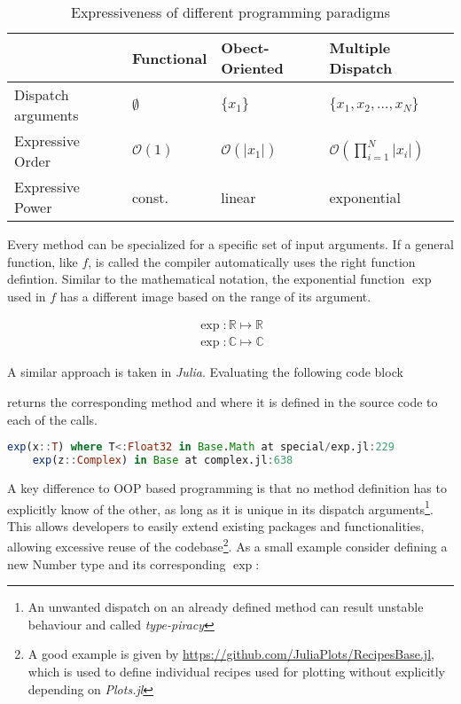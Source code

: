 \begin{table}
    \begin{tabular}{|l|l|l|l|} \hline
        & Functional & Obect-Oriented & Multiple Dispatch \\ \hline
        Dispatch arguments & $\emptyset$ & $\lbrace x_1 \rbrace$ & $\lbrace x_1 , x_2, \dots, x_N \rbrace$ \\
        Expressive Order &  $\mathcal{O}\left(1\right)$ & $\mathcal{O}\left(\left|x_1\right|\right)$ &  $\mathcal{O}\left(\prod_{i=1}^N \left|x_i\right|\right)$ \\
        Expressive Power & const. & linear & exponential \\ \hline
    \end{tabular}
    \caption{Expressiveness of different programming paradigms}
    \label{JM:tab:ExpressivePow}
\end{table}


Every method can be specialized for a specific set of input arguments. If a general function, like $f$, is called the compiler automatically uses the right function defintion. Similar to the mathematical notation, the exponential function $\exp$ used in $f$ has a different image based on the range of its argument. 

\begin{align*}
    \exp : \mathbb{R} \mapsto \mathbb{R} \\
    \exp : \mathbb{C} \mapsto \mathbb{C}
\end{align*}

A similar approach is taken in \textit{Julia}. Evaluating the following code block 



returns the corresponding method and where it is defined in the source code to each of the calls.

\begin{lstlisting}[language=Julia]
    exp(x::T) where T<:Float32 in Base.Math at special/exp.jl:229
    exp(z::Complex) in Base at complex.jl:638
\end{lstlisting}

A key difference to OOP based programming is that no method definition has to explicitly know of the other, as long as it is unique in its dispatch arguments\footnote{An unwanted dispatch on an already defined method can result unstable behaviour and called \textit{type-piracy}}.
This allows developers to easily extend existing packages and functionalities, allowing excessive reuse of the codebase\footnote{A good example is given by \url{https://github.com/JuliaPlots/RecipesBase.jl}, which is used to define individual recipes used for plotting without explicitly depending on \textit{Plots.jl}}. 
As a small example consider defining a new Number type and its corresponding $\exp$:

